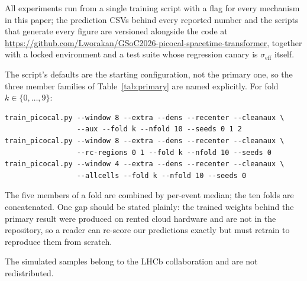 \documentclass[11pt,a4paper]{article}
\newcommand{\seff}{\ensuremath{\sigma_{\mathrm{eff}}}}
\begin{document}
All experiments run from a single training script with a flag for every
mechanism in this paper; the prediction CSVs behind every reported number
and the scripts that generate every figure are versioned alongside the code
at \url{https://github.com/Lworakan/GSoC2026-picocal-spacetime-transformer},
together with a locked environment and a test suite whose regression canary
is \seff{} itself.

The script's defaults are the starting configuration, not the primary one,
so the three member families of Table~\ref{tab:primary} are named
explicitly. For fold $k \in \{0,\dots,9\}$:
\begin{verbatim}
train_picocal.py --window 8 --extra --dens --recenter --cleanaux \
                 --aux --fold k --nfold 10 --seeds 0 1 2
train_picocal.py --window 8 --extra --dens --recenter --cleanaux \
                 --rc-regions 0 1 --fold k --nfold 10 --seeds 0
train_picocal.py --window 4 --extra --dens --recenter --cleanaux \
                 --allcells --fold k --nfold 10 --seeds 0
\end{verbatim}
The five members of a fold are combined by per-event median; the ten folds
are concatenated. One gap should be stated plainly: the trained weights
behind the primary result were produced on rented cloud hardware and are not
in the repository, so a reader can re-score our predictions exactly but must
retrain to reproduce them from scratch.

The simulated samples belong to the LHCb collaboration and are not
redistributed.
\end{document}
